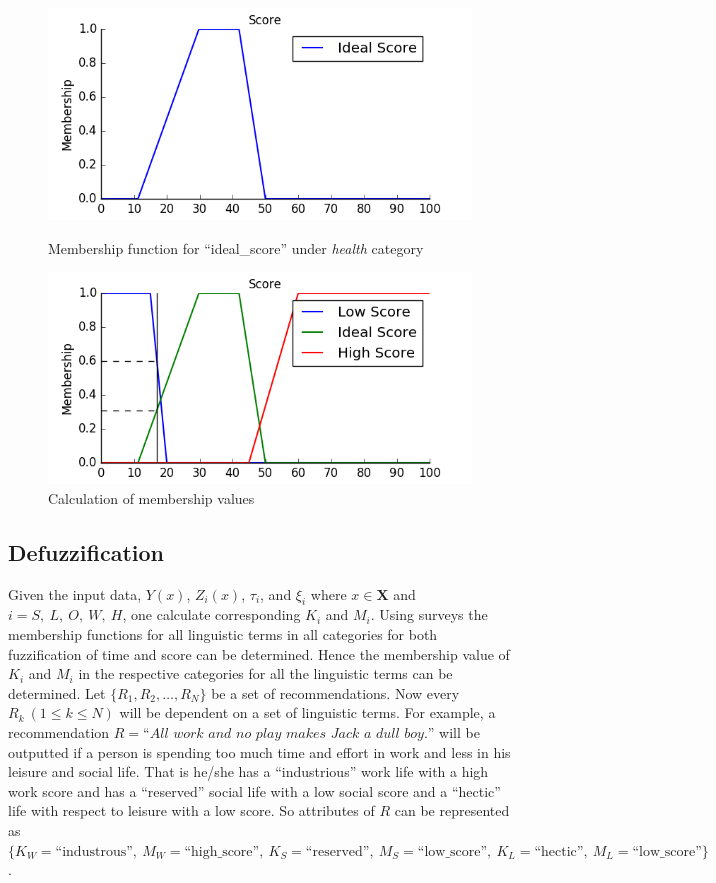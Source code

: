 \documentclass[conference]{IEEEtran}
\newcommand{\quotes}[1]{``#1''}
\begin{document}
\begin{figure}[h!]
\centering
\captionsetup{justification=centering}
\noindent \includegraphics[scale=0.5]{ideal_health}
\caption{Membership function for \quotes{ideal\_score} under \textit{health} category}
\noindent \includegraphics[scale=0.5]{health_score}
\caption{Calculation of membership values}
\end{figure}
\subsection{Defuzzification}
Given the input data, $Y(x)$, $Z_i(x)$, $\tau_i$, and $\xi_i$ where $x \in \mathbf{X}$ and $i = S,\ L,\ O,\ W,\ H$, one calculate corresponding $K_i$ and $M_i$. Using surveys the membership functions for all linguistic terms in all categories for both fuzzification of time and score can be determined. Hence the membership value of $K_i$ and $M_i$ in the respective categories for all the linguistic terms can be determined. Let $\{R_1, R_2, \ldots, R_N\}$ be a set of recommendations. Now every $R_k\ (1 \leq k \leq N)$ will be dependent on a set of linguistic terms. For example, a recommendation $R = \textit{\quotes{All work and no play makes Jack a dull boy.}}$ will be outputted if a person is spending too much time and effort in work and less in his leisure and social life. That is he/she has a \quotes{industrious} work life with a high work score and has a \quotes{reserved} social life with a low social score and a \quotes{hectic} life with respect to leisure with a low score. So attributes of $R$ can be represented as $\{K_W=\text{\quotes{industrous}},\ M_W=\text{\quotes{high\_score}},\ K_S=\text{\quotes{reserved}},\ M_S=\text{\quotes{low\_score}},\ K_L=\text{\quotes{hectic}},\ M_L=\text{\quotes{low\_score}}\}$.
\end{document}
